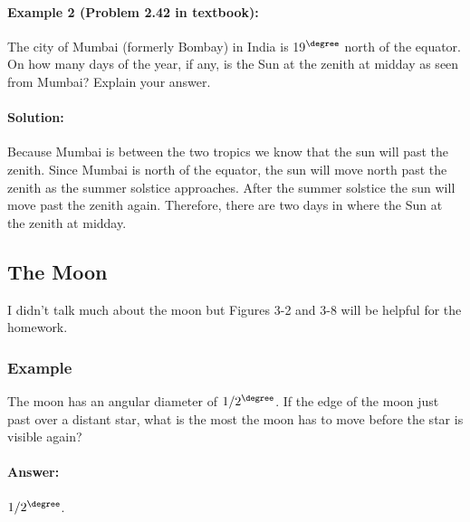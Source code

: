 \paragraph{Example 2 (Problem 2.42 in textbook):} The city of Mumbai (formerly Bombay) in India is 19$^\degree$ north of the equator. On how many days of the year, if any, is the Sun at the zenith at midday as seen from Mumbai? Explain your answer.
\paragraph{Solution:} Because Mumbai is between the two tropics we know that the sun will past the zenith. Since Mumbai is north of the equator, the sun will move north past the zenith as the summer solstice approaches. After the summer solstice the sun will move past the zenith again. Therefore, there are two days in where the Sun at the zenith at midday.

\subsection*{The Moon}

I didn't talk much about the moon but Figures 3-2 and 3-8 will be helpful for the homework.

\subsubsection*{Example}

The moon has an angular diameter of $1/2^\degree$. If the edge of the moon just past over a distant star, what is the most the moon has to move before the star is visible again?

\paragraph*{Answer:} $1/2^\degree$.
